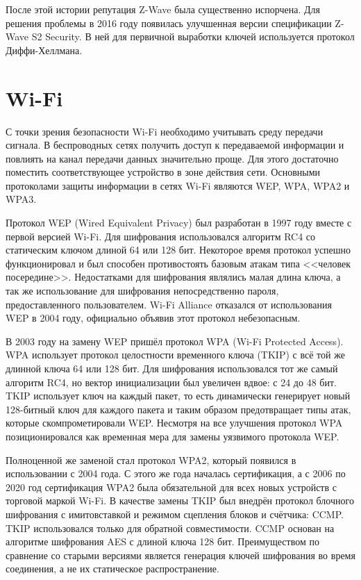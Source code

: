 	После этой истории репутация Z-Wave была существенно испорчена. Для решения проблемы в 2016 году
	появилась улучшенная версии спецификации Z-Wave S2 Security. В ней для первичной выработки ключей
	используется протокол Диффи-Хеллмана.
	
	
	\section{Wi-Fi}
	С точки зрения безопасности Wi-Fi необходимо учитывать среду передачи сигнала. В беспроводных сетях 
	получить доступ к передаваемой информации и повлиять на канал передачи данных значительно проще. 
	Для этого достаточно поместить соответствующее устройство в зоне действия сети. Основными протоколами
	защиты информации в сетях Wi-Fi являются WEP, WPA, WPA2 и WPA3.
	
	Протокол WEP (Wired Equivalent Privacy) был разработан в 1997 году вместе с первой версией Wi-Fi.
	Для шифрования использовался алгоритм RC4 со статическим ключом длиной 64 или 128 бит. Некоторое время
	протокол успешно функционировал и был способен противостоять базовым атакам типа <<человек посередине>>.
	Недостатками для шифрования являлись малая длина ключа, а так же использование для шифрования 
	непосредственно пароля, предоставленного пользователем. Wi-Fi Alliance отказался от использования WEP
	в 2004 году, официально объявив этот протокол небезопасным.
	
	В 2003 году на замену WEP пришёл протокол WPA (Wi-Fi Protected Access). WPA использует протокол 
	целостности временного ключа (TKIP) с всё той же длинной ключа 64 или 128 бит. Для шифрования
	использовался тот же самый алгоритм RC4, но вектор инициализации был увеличен вдвое: с 24 до 48 бит.
	TKIP использует ключ на каждый пакет, то есть динамически генерирует новый 128-битный ключ для 
	каждого пакета и таким образом предотвращает типы атак, которые скомпрометировали WEP. Несмотря
	на все улучшения протокол WPA позиционировался как временная мера для замены уязвимого протокола
	WEP.
	
	Полноценной же заменой стал протокол WPA2, который появился в использовании с 2004 года. С этого
	же года началась сертификация, а с 2006 по 2020 год сертификация WPA2 была обязательной для всех
	новых устройств с торговой маркой Wi-Fi. В качестве замены TKIP был внедрён протокол блочного 
	шифрования с имитовставкой и режимом сцепления блоков и счётчика: CCMP. TKIP использовался
	только для обратной совместимости. CCMP основан на алгоритме шифрования AES с длиной ключа 128 бит.
	Преимуществом по сравнение со старыми версиями является генерация ключей шифрования во время
	соединения, а не их статическое распространение.
	
